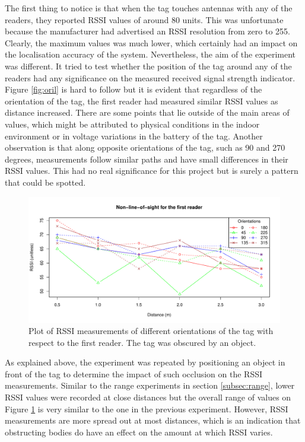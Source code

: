 The first thing to notice is that when the tag touches antennas with any of the readers, they reported RSSI values of around 80 units. This was unfortunate because the manufacturer had advertised an RSSI resolution from zero to 255. Clearly, the maximum values was much lower, which certainly had an impact on the localisation accuracy of the system. Nevertheless, the aim of the experiment was different. It tried to test whether the position of the tag around any of the readers had any significance on the measured received signal strength indicator. Figure \ref{fig:oril} is hard to follow but it is evident that regardless of the orientation of the tag, the first reader had measured similar RSSI values as distance increased. There are some points that lie outside of the main areas of values, which might be attributed to physical conditions in the indoor environment or in voltage variations in the battery of the tag. Another observation is that along opposite orientations of the tag, such as 90 and 270 degrees, measurements follow similar paths and have small differences in their RSSI values. This had no real significance for this project but is surely a pattern that could be spotted. 
\begin{figure}[h]
	\begin{center}
		\includegraphics[width=1\textwidth]{figures/rssi_distance_3m_nlos_r1}
		\caption{Plot of RSSI measurements of different orientations of the tag with respect to the first reader. The tag was obscured by an object.}
		\label{fig:orin}
	\end{center}
\end{figure}

As explained above, the experiment was repeated by positioning an object in front of the tag to determine the impact of such occlusion on the RSSI measurements. Similar to the range experiments in section \ref{subsec:range}, lower RSSI values were recorded at close distances but the overall range of values on Figure \ref{fig:orin} is very similar to the one in the previous experiment. However, RSSI measurements are more spread out at most distances, which is an indication that obstructing bodies do have an effect on the amount at which RSSI varies.


